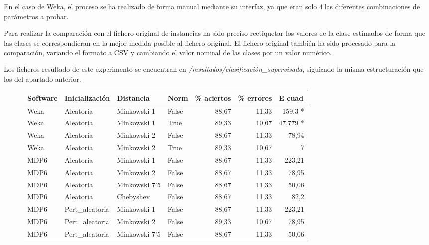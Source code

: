 \documentclass[a4paper]{report}
\begin{document}
	En el caso de Weka, el proceso se ha realizado de forma manual mediante su interfaz, ya que eran solo 4 las diferentes combinaciones de parámetros a probar.
	
	Para realizar la comparación con el fichero original de instancias ha sido preciso reetiquetar los valores de la clase estimados de forma que las clases se correspondieran en la mejor medida posible al fichero original. El fichero original también ha sido procesado para la comparación, variando el formato a CSV y cambiando el valor nominal de las clases por un valor numérico.
	
	Los ficheros resultado de este experimento se encuentran en \textit{/resultados/clasificación\_supervisada}, siguiendo la misma estructuración que los del apartado anterior.
	
	\begin{figure}[htbp]
		\begin{center}
			\begin{tabular}{|l|l|l|l|r|r|r|}
				\hline
				\textbf{Software} & \textbf{Inicialización} & \textbf{Distancia} & \textbf{Norm} & \multicolumn{1}{l|}{\textbf{\% aciertos}} & \multicolumn{1}{l|}{\textbf{\% errores}} & \multicolumn{1}{l|}{\textbf{E cuad}} \\ \hline
				Weka & Aleatoria & Minkowski 1 & False & 88,67 & 11,33 & 159,3 * \\ \hline
				Weka & Aleatoria & Minkowski 1 & True & 89,33 & 10,67 & 47,779 * \\ \hline
				Weka & Aleatoria & Minkowski 2 & False & 88,67 & 11,33 & 78,94 \\ \hline
				Weka & Aleatoria & Minkowski 2 & True & 89,33 & 10,67 & 7 \\ \hline
				MDP6 & Aleatoria & Minkowski 1 & False & 88,67 & 11,33 & 223,21 \\ \hline
				MDP6 & Aleatoria & Minkowski 2 & False & 88,67 & 11,33 & 78,95 \\ \hline
				MDP6 & Aleatoria & Minkowski 7'5 & False & 88,67 & 11,33 & 50,06 \\ \hline
				MDP6 & Aleatoria & Chebyshev & False & 88,67 & 11,33 & 82,2 \\ \hline
				MDP6 & Pert\_aleatoria & Minkowski 1 & False & 88,67 & 11,33 & 223,21 \\ \hline
				MDP6 & Pert\_aleatoria & Minkowski 2 & False & 89,33 & 10,67 & 78,95 \\ \hline
				MDP6 & Pert\_aleatoria & Minkowski 7'5 & False & 88,67 & 11,33 & 50,06 \\ \hline

\end{tabular}
\end{center}
\end{figure}
\end{document}
